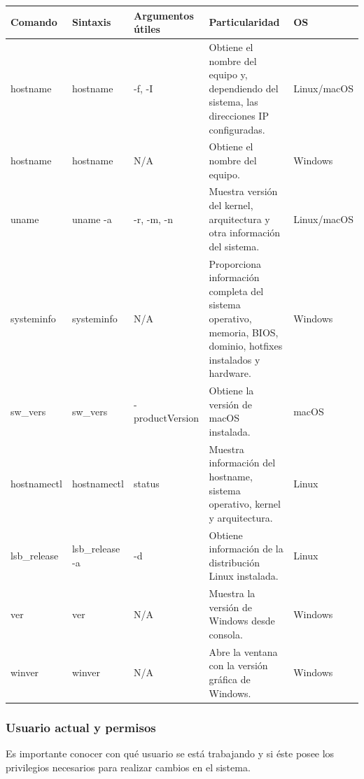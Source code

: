 \documentclass[a4paper,10pt]{article}
\begin{document}
\begin{longtable}{|p{2.8cm}|p{3.1cm}|p{4.3cm}|p{5.5cm}|p{1.5cm}|}

\hline
\textbf{Comando} &
\textbf{Sintaxis} &
\textbf{Argumentos útiles} &
\textbf{Particularidad} &
\textbf{OS}
\\
\hline
\endhead

hostname &
hostname &
-f, -I &
Obtiene el nombre del equipo y, dependiendo del sistema, las direcciones IP configuradas. &
Linux/macOS
\\
\hline

hostname &
hostname &
N/A &
Obtiene el nombre del equipo. &
Windows
\\
\hline

uname &
uname -a &
-r, -m, -n &
Muestra versión del kernel, arquitectura y otra información del sistema. &
Linux/macOS
\\
\hline

systeminfo &
systeminfo &
N/A &
Proporciona información completa del sistema operativo, memoria, BIOS, dominio, hotfixes instalados y hardware. &
Windows
\\
\hline

sw\_vers &
sw\_vers &
-productVersion &
Obtiene la versión de macOS instalada. &
macOS
\\
\hline

hostnamectl &
hostnamectl &
status &
Muestra información del hostname, sistema operativo, kernel y arquitectura. &
Linux
\\
\hline

lsb\_release &
lsb\_release -a &
-d &
Obtiene información de la distribución Linux instalada. &
Linux
\\
\hline

ver &
ver &
N/A &
Muestra la versión de Windows desde consola. &
Windows
\\
\hline

winver &
winver &
N/A &
Abre la ventana con la versión gráfica de Windows. &
Windows
\\
\hline

\end{longtable}


\subsubsection{Usuario actual y permisos}

Es importante conocer con qué usuario se está trabajando y si éste posee los
privilegios necesarios para realizar cambios en el sistema.
\end{document}
